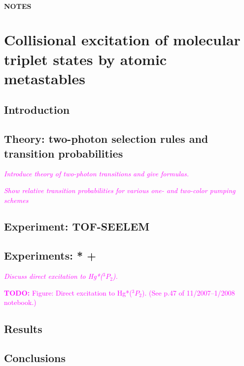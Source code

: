\documentclass[12pt]{mitthesis}
\newcommand{\TODO} [1]{\textcolor{magenta}{\textbf{TODO:} #1}}
\newcommand{\POINT}[1]{\textcolor{magenta}{\emph{#1}}}
\begin{document}
\tableofcontents
\clearpage

\subsubsection*{NOTES}
\clearpage

\chapter{Collisional excitation of molecular triplet states by atomic
  metastables}

\section{Introduction}

\section{Theory: two-photon selection rules and transition probabilities}

\POINT{Introduce theory of two-photon transitions and give formulas.}

\POINT{Show relative transition probabilities for various one- and
  two-color pumping schemes}

\section{Experiment: TOF-SEELEM}

\section{Experiments: * + }

\POINT{Discuss direct excitation to Hg*($^3P_2$).}

\TODO{Figure: Direct excitation to Hg*($^3P_2$). (See p.47 of
  11/2007--1/2008 notebook.)}

\section{Results}

\section{Conclusions}
\end{document}
